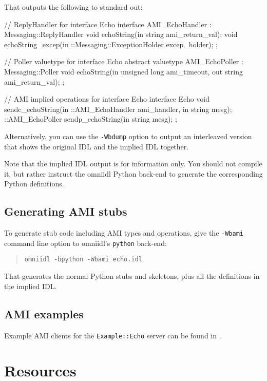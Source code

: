 \documentclass[11pt,oneside,a4paper]{book}
\newcommand{\intf}[1]{\texttt{#1}}
\newcommand{\cmdline}[1]{\texttt{#1}}
\begin{document}
\noindent That outputs the following to standard out:

\begin{idllisting}
// ReplyHandler for interface Echo
interface AMI_EchoHandler : Messaging::ReplyHandler {
  void echoString(in string ami_return_val);
  void echoString_excep(in ::Messaging::ExceptionHolder excep_holder);
};

// Poller valuetype for interface Echo
abstract valuetype AMI_EchoPoller : Messaging::Poller {
  void echoString(in unsigned long ami_timeout, out string ami_return_val);
};

// AMI implied operations for interface Echo
interface Echo {
  void sendc_echoString(in ::AMI_EchoHandler ami_handler, in string mesg);
  ::AMI_EchoPoller sendp_echoString(in string mesg);
};
\end{idllisting}

\noindent Alternatively, you can use the \cmdline{-Wbdump} option to
output an interleaved version that shows the original IDL and the
implied IDL together.

Note that the implied IDL output is for information only. You should
not compile it, but rather instruct the omniidl Python back-end to
generate the corresponding Python definitions.


\section{Generating AMI stubs}

To generate stub code including AMI types and operations, give the
\cmdline{-Wbami} command line option to omniidl's \cmdline{python}
back-end:

\begin{quote}
\cmdline{omniidl -bpython -Wbami echo.idl}
\end{quote}

\noindent That generates the normal Python stubs and skeletons, plus
all the definitions in the implied IDL.


\section{AMI examples}

Example AMI clients for the \intf{Example::Echo} server can be found in
.



\chapter{Resources}
\end{document}
